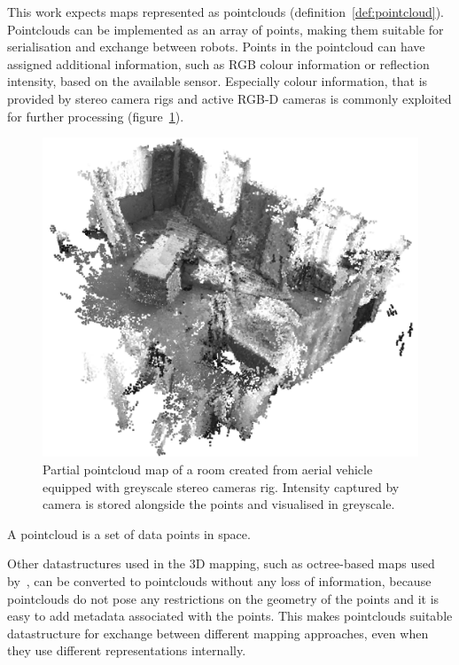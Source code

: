 This work expects maps represented as pointclouds (definition~\ref{def:pointcloud}). Pointclouds can be implemented as an array of points, making them suitable for serialisation and exchange between robots. Points in the pointcloud can have assigned additional information, such as \gls{RGB} colour information or reflection intensity, based on the available sensor. Especially colour information, that is provided by stereo camera rigs and active \gls{RGB-D} cameras is commonly exploited for further processing (figure~\ref{fig:v1-greyscale}).

\begin{figure}
    \centering
    \includegraphics[width=\textwidth]{../img/v1-greyscale.png}
    \caption[Pointcloud map with greyscale colours]{Partial pointcloud map of a room created from aerial vehicle equipped with greyscale stereo cameras rig. Intensity captured by camera is stored alongside the points and visualised in greyscale.}
    \label{fig:v1-greyscale}
\end{figure}

\begin{defn}[Pointcloud]
\label{def:pointcloud}
A pointcloud is a set of data points in space.
\end{defn}

Other datastructures used in the \gls{3D} mapping, such as octree-based maps used by~\citet{hornung2013octomap}, can be converted to pointclouds without any loss of information, because pointclouds do not pose any restrictions on the geometry of the points and it is easy to add metadata associated with the points. This makes pointclouds suitable datastructure for exchange between different mapping approaches, even when they use different representations internally.

